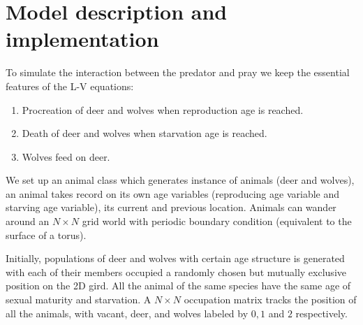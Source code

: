 \documentclass[a4paper,12pt]{article}
\begin{document}
\section{Model description and implementation}
To simulate the interaction between the predator and pray we keep the essential features of the L-V equations:
\begin{enumerate}
	\item Procreation of deer and wolves when reproduction age is reached.
	\item Death of deer and wolves when starvation age is reached.
	\item Wolves feed on deer.
\end{enumerate}

We set up an animal class which generates instance of animals (deer and wolves), an animal takes record on its own age variables (reproducing age variable and starving age variable), its current and previous location. Animals can wander around an $N \times N$ grid world with periodic boundary condition (equivalent to the surface of a torus).

Initially, populations of deer and wolves with certain age structure is generated with each of their members occupied a randomly chosen but mutually exclusive position on the 2D gird. All the animal of the same species have the same age of sexual maturity and starvation.  A $N \times N$ occupation matrix tracks the position of all the animals, with vacant, deer, and wolves labeled by $0, 1$  and $2$ respectively. 
\end{document}
